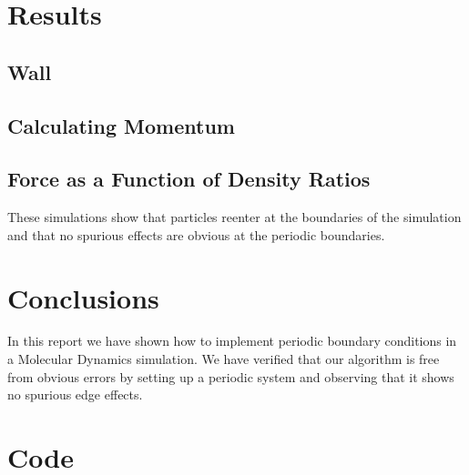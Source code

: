 \documentclass{article}
\begin{document}
\section{Results}
\subsection{Wall}
\subsection{Calculating Momentum}
\subsection{Force as a Function of Density Ratios}



These simulations show that particles reenter at the boundaries of the simulation and that no spurious effects are obvious at the periodic boundaries.

\section{Conclusions}
In this report we have shown how to implement periodic boundary conditions in a Molecular Dynamics simulation. We have verified that our algorithm is free from obvious errors by setting up a periodic system and observing that it shows no spurious edge effects.


\appendix
\section{Code}

\end{document}
